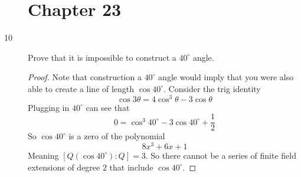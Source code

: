 \documentclass[11pt]{article}
\begin{document}
\begin{description}
\section{Chapter 23}
\item[10] Prove that it is impossible to construct a $40^\circ$ angle.\\ 
	\begin{proof}
	Note that construction a $40^\circ$ angle would imply that you were
	also able to create a line of length $\cos40^\circ$.
	Consider the trig identity
		$$\cos{3\theta} =  4\cos^3\theta - 3 \cos\theta$$
	Plugging in $40^\circ$ can see that
		$$0 = \cos^3 40^\circ - 3 \cos 40^\circ + \frac{1}{2} $$
	So $\cos40^\circ$ is a zero of the polynomial
		$$8x^3 + 6x + 1$$
	Meaning $[Q(\cos40^\circ):Q] = 3$. So there cannot be a series of finite
		field extensions of degree $2$ that include $\cos40^\circ$.
	\end{proof}

\end{description}
\end{document}
